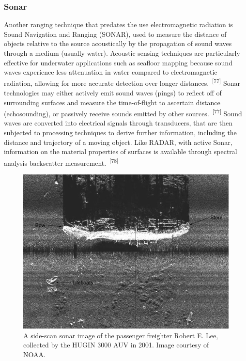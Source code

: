 \documentclass{article}
\begin{document}
\subsubsection{Sonar}


\par{Another ranging technique that predates the use electromagnetic radiation is Sound Navigation and Ranging (SONAR), used to measure the distance of objects relative to the source acoustically by the propagation of sound waves through a medium (usually water). Acoustic sensing techniques are particularly effective for underwater applications such as seafloor mapping because sound waves experience less attenuation in water compared to electromagnetic radiation, allowing for more accurate detection over longer distances.~\textsuperscript{[77]} Sonar technologies may either actively emit sound waves (pings) to reflect off of surrounding surfaces and measure the time-of-flight to ascertain distance (echosounding), or passively receive sounds emitted by other sources.~\textsuperscript{[77]} Sound waves are converted into electrical signals through transducers, that are then subjected to processing techniques to derive further information, including the distance and trajectory of a moving object. Like RADAR, with active Sonar, information on the material properties of surfaces is available through spectral analysis backscatter measurement.~\textsuperscript{[78]}}


\begin{figure}
    \centering
    \includegraphics[width=0.8\linewidth]{images/lee-sonar.jpg}
    \caption{A side-scan sonar image of the passenger freighter Robert E. Lee, collected by the HUGIN 3000 AUV in 2001. Image courtesy of NOAA.}
    \label{figure22}
\end{figure}
\end{document}
